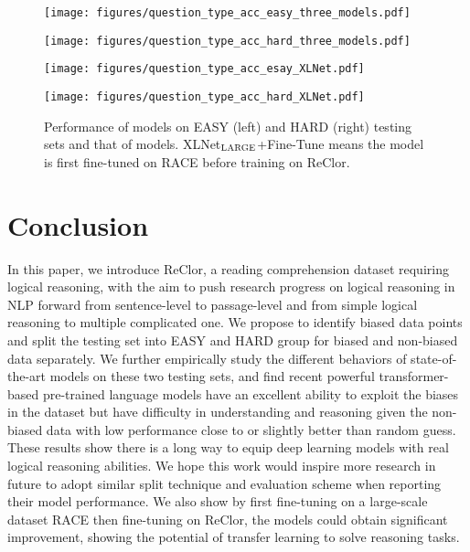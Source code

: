 \documentclass{article} \usepackage{iclr2020_conference,times}
\newcommand\xlnetlarge{XLNet$_{\small \textsc{LARGE}}$\xspace}
\begin{document}
\begin{figure}[htbp]
    \centering
        \begin{minipage}[t]{0.49\textwidth}
            \centering
            \texttt{[image: figures/question\_type\_acc\_easy\_three\_models.pdf]}
        \end{minipage}
        \begin{minipage}[t]{0.49\textwidth}
            \centering
            \texttt{[image: figures/question\_type\_acc\_hard\_three\_models.pdf]}
        \end{minipage}
        \begin{minipage}[t]{0.49\textwidth}
            \centering
            \texttt{[image: figures/question\_type\_acc\_esay\_XLNet.pdf]}
        \end{minipage}
        \begin{minipage}[t]{0.49\textwidth}
            \centering
            \texttt{[image: figures/question\_type\_acc\_hard\_XLNet.pdf]}
        \end{minipage}
    \caption{Performance of models on EASY (left) and HARD (right) testing sets and that of models. \xlnetlarge+Fine-Tune means the model is first fine-tuned on RACE before training on ReClor.}
    \label{fig:easy_and_hard_questioni_type_acc}
\end{figure}
    
    
\section{Conclusion}
In this paper, we introduce ReClor, a reading comprehension dataset requiring logical reasoning, with the aim to push research progress on logical reasoning in NLP forward from sentence-level to passage-level and from simple logical reasoning to multiple complicated one. We propose to identify biased data points and split the testing set into EASY and HARD group for biased and non-biased data separately. We further empirically study the different behaviors of state-of-the-art models on these two testing sets, and find recent powerful transformer-based pre-trained language models have an excellent ability to exploit the biases in the dataset but have difficulty in understanding and reasoning given the non-biased data with low performance close to or slightly better than random guess. These results show there is a long way to equip deep learning models with real logical reasoning abilities. We hope this work would inspire more research in future to adopt similar split technique and evaluation scheme when reporting their model performance. We also show by first fine-tuning on a large-scale dataset RACE then fine-tuning on ReClor, the models could obtain significant improvement, showing the potential of transfer learning to solve reasoning tasks. 
\end{document}
